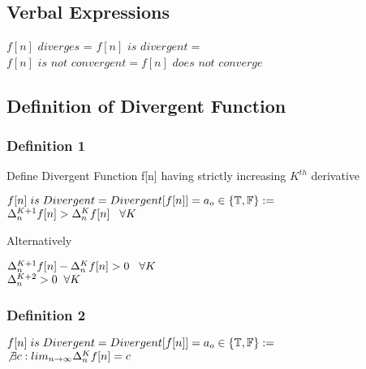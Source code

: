 \documentclass[11pt]{article}
\begin{document}
\subsection{Verbal Expressions}
\begin{center}
\vspace{1mm}
$
f[n]$ $diverges$ = $f[n]$ $is$ $divergent =
$
\\ \vspace{2mm}
$
f[n]$ $is$ $not$ $convergent= f[n]$ $does$ $not$ $converge
$
\end{center}

\subsection{Definition of Divergent Function}



\subsubsection{Definition 1}
Define Divergent Function f[n] having strictly increasing $K^{th}$ derivative
\vspace{1mm}
\begin{center}
$
f[n]\hspace{1mm} is \hspace{1mm} Divergent = Divergent[f[n]] = a_o \in \{\mathbb{T},\mathbb{F}\} :=
$
\\ \vspace{4mm}
$
\Delta_n^{K+1} f[n] > \Delta_n^{K}f[n] \hspace{3mm} \forall K
$
\end{center}
Alternatively
\begin{center}
$
\Delta_n^{K+1} f[n] - \Delta_n^{K}f[n] > 0 \hspace{3mm} \forall K
$
\\ \vspace{4mm}
$
\Delta_{n}^{K+2} > 0 \hspace{2mm} \forall K
$
\end{center}

\subsubsection{Definition 2}
\begin{center}
\vspace{2mm}
$
f[n]\hspace{1mm} is \hspace{1mm} Divergent = Divergent[f[n]] = a_o \in \{\mathbb{T},\mathbb{F}\} :=
$
\\ \vspace{4mm}
$
\not \exists c: lim_{n\rightarrow \infty} \Delta_n^K f[n] = c
$
\end{center}
\end{document}
